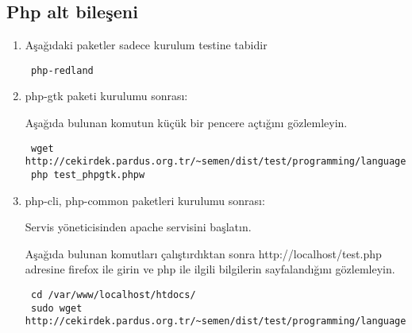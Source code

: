 \documentclass[a4paper,10pt]{article}
\begin{document}
\subsection{Php alt bileşeni}
\begin{enumerate}

\item Aşağıdaki paketler sadece kurulum testine tabidir
\begin{verbatim}
 php-redland
\end{verbatim}

\item php-gtk paketi kurulumu sonrası:

Aşağıda bulunan komutun küçük bir pencere açtığını gözlemleyin.
\begin{verbatim}
 wget http://cekirdek.pardus.org.tr/~semen/dist/test/programming/language/php/test_phpgtk.phpw
 php test_phpgtk.phpw
\end{verbatim}

\item php-cli, php-common paketleri kurulumu sonrası:

Servis yöneticisinden apache servisini başlatın.

Aşağıda bulunan komutları çalıştırdıktan sonra http://localhost/test.php adresine firefox ile girin ve php ile ilgili bilgilerin sayfalandığını gözlemleyin.

\begin{verbatim}
 cd /var/www/localhost/htdocs/
 sudo wget http://cekirdek.pardus.org.tr/~semen/dist/test/programming/language/php/test.php 
\end{verbatim}

\end{enumerate}
\end{document}
